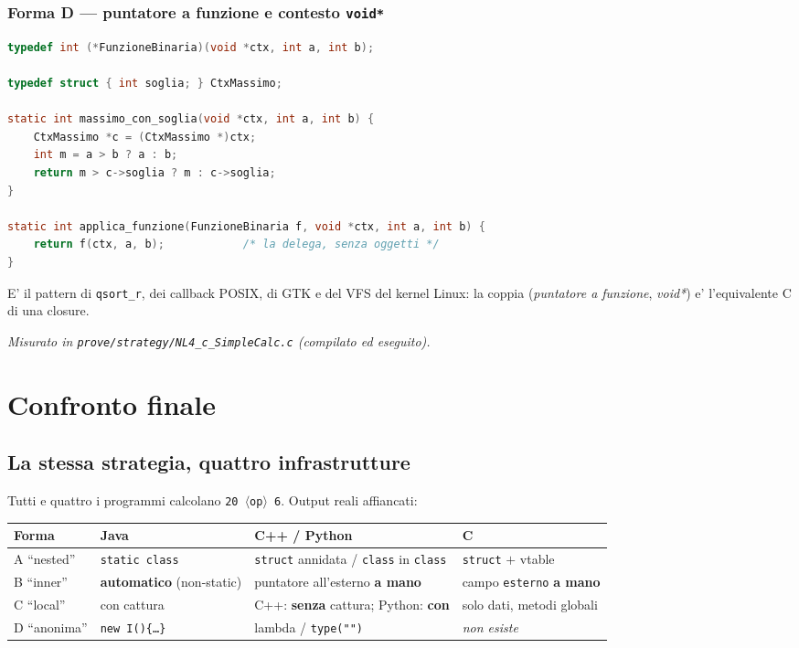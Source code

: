 \documentclass{report}
\newcommand{\code}[1]{\texttt{\small #1}}
\newcommand{\fonteprove}[1]{{\footnotesize\itshape\color{gray} Misurato in \code{prove/strategy/#1} (compilato ed eseguito).\par}}
\begin{document}
\subsection{Forma D --- puntatore a funzione e contesto \texttt{void*}}

\begin{lstlisting}[language=C]
typedef int (*FunzioneBinaria)(void *ctx, int a, int b);

typedef struct { int soglia; } CtxMassimo;

static int massimo_con_soglia(void *ctx, int a, int b) {
    CtxMassimo *c = (CtxMassimo *)ctx;
    int m = a > b ? a : b;
    return m > c->soglia ? m : c->soglia;
}

static int applica_funzione(FunzioneBinaria f, void *ctx, int a, int b) {
    return f(ctx, a, b);            /* la delega, senza oggetti */
}
\end{lstlisting}

E' il pattern di \code{qsort\_r}, dei callback POSIX, di GTK e del VFS del
kernel Linux: la coppia (\emph{puntatore a funzione}, \emph{void*}) e'
l'equivalente C di una closure.

\fonteprove{NL4\_c\_SimpleCalc.c}

\chapter{Confronto finale}\label{ch:confronto}

\section{La stessa strategia, quattro infrastrutture}

Tutti e quattro i programmi calcolano \code{20 \(\langle\)op\(\rangle\)
6}. Output reali affiancati:

\begin{center}
\renewcommand{\arraystretch}{1.3}
\footnotesize
\begin{tabular}{|>{\raggedright\arraybackslash}p{2.4cm}|>{\raggedright\arraybackslash}p{3.3cm}|>{\raggedright\arraybackslash}p{3.3cm}|>{\raggedright\arraybackslash}p{3.3cm}|}
\hline
\textbf{Forma} & \textbf{Java} & \textbf{C++ / Python} & \textbf{C} \\
\hline
A ``nested'' & \code{static class} & \code{struct} annidata / \code{class} in \code{class} & \code{struct} $+$ vtable \\
\hline
B ``inner'' & \textbf{automatico} (non-static) & puntatore all'esterno \textbf{a mano} & campo \code{esterno} \textbf{a mano} \\
\hline
C ``local'' & con cattura & C++: \textbf{senza} cattura; Python: \textbf{con} & solo dati, metodi globali \\
\hline
D ``anonima'' & \code{new I()\{\dots\}} & lambda / \code{type("")} & \emph{non esiste} \\
\hline
\end{tabular}
\end{center}
\end{document}
